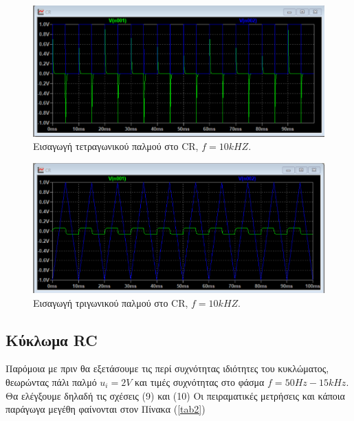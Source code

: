 \documentclass[a4paper]{article}
\begin{document}
		\begin{figure}[h!]
			\centering 
			\includegraphics[scale=0.4]{./figures/cr_rec_10.png}
			\caption{Εισαγωγή τετραγωνικού παλμού στο CR, $f=10kHZ$.}
			\label{fig9}
		\end{figure}
		
		\begin{figure}[h!]
			\centering 
			\includegraphics[scale=0.4]{./figures/cr_triag_10.png}
			\caption{Εισαγωγή τριγωνικού παλμού στο CR, $f=10kHZ$.}
			\label{fig10}
		\end{figure}
		
		\newpage
		
	\subsection*{Κύκλωμα RC}
		Παρόμοια με πριν θα εξετάσουμε τις περί συχνότητας ιδιότητες του κυκλώματος, θεωρώντας πάλι παλμό $u_i = 2V$ και τιμές συχνότητας στο φάσμα $f=50Hz-15kHz$. Θα ελέγξουμε δηλαδή τις σχέσεις (9) και (10)
		Οι πειραματικές μετρήσεις και κάποια παράγωγα μεγέθη φαίνονται στον Πίνακα (\ref{tab2})
		
\end{document}
